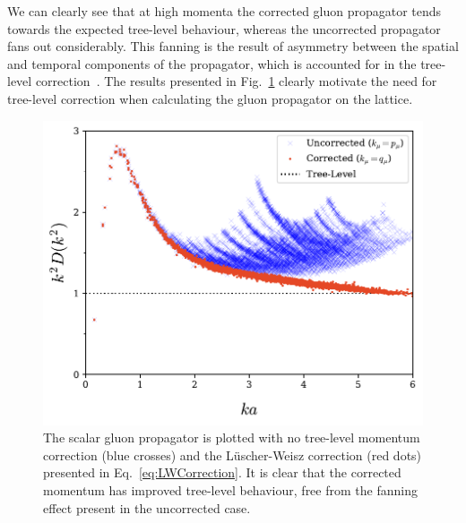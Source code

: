 We can clearly see that at high momenta the corrected gluon propagator tends towards the expected tree-level behaviour, whereas the uncorrected propagator fans out considerably. This fanning is the result of asymmetry between the spatial and temporal components of the propagator, which is accounted for in the tree-level correction~\cite{Marenzoni:1994ap}. The results presented in Fig.~\ref{fig:MomentumComparison} clearly motivate the need for tree-level correction when calculating the gluon propagator on the lattice.\\ 
%
\begin{figure}[H]
\centering
\includegraphics[width=\linewidth]{./ScalarGluComp_q2_MomentumComparison.pdf}
\caption[The renormalised scalar gluon propagator is plotted with no tree-level momentum correction and the L\"uscher-Weisz correction.]{\label{fig:MomentumComparison} The scalar gluon propagator is plotted with no tree-level momentum correction (blue crosses) and the L\"uscher-Weisz correction (red dots) presented in Eq.~\eqref{eq:LWCorrection}. It is clear that the corrected momentum has improved tree-level behaviour, free from the fanning effect present in the uncorrected case.}
\end{figure}
%

